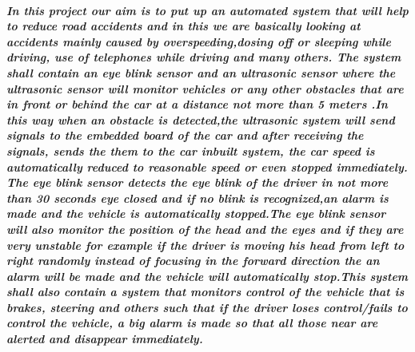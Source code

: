 \documentclass[a4paper,12pt]{article}
\begin{document}
\paragraph{\sl
In this project our aim is to put up an automated system that will help to reduce road accidents and in this we are basically looking at accidents mainly caused by overspeeding,dosing off or sleeping while driving, use of telephones while driving and many others. The system shall contain an eye blink sensor and an ultrasonic sensor where the ultrasonic sensor will monitor vehicles or any other obstacles that are in front or behind the car at a distance not more than 5 meters .In this way when an obstacle is detected,the ultrasonic system will send signals to the embedded board of the car and after receiving the signals, sends the them to the car inbuilt system, the car speed is automatically reduced to reasonable speed or even stopped immediately. The eye blink sensor detects the eye blink of the driver in not more than 30 seconds eye closed and if no blink is recognized,an alarm is made and the vehicle is automatically stopped.The eye blink sensor will also monitor the position of the head and the eyes and if they are very unstable for example if the driver is moving his head from left to right randomly instead of focusing in the forward direction the an alarm will be made and the vehicle will automatically stop.This system shall also contain a system that monitors control of the vehicle that is brakes, steering and others such that if the driver loses control/fails to control the vehicle, a big alarm is made so that all those near are alerted and disappear immediately.}
\end{document}
